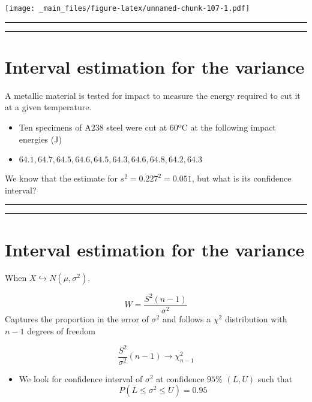 \documentclass[
]{book}
\providecommand{\tightlist}{%
  \setlength{\itemsep}{0pt}\setlength{\parskip}{0pt}}
\begin{document}
\texttt{[image: \_main\_files/figure-latex/unnamed-chunk-107-1.pdf]}

\begin{center}\rule{0.5\linewidth}{0.5pt}\end{center}

\begin{center}\rule{0.5\linewidth}{0.5pt}\end{center}

\hypertarget{interval-estimation-for-the-variance}{%
\section{Interval estimation for the variance}\label{interval-estimation-for-the-variance}}

A metallic material is tested for impact to measure the energy required to cut it at a given temperature.

\begin{itemize}
\item
  Ten specimens of A238 steel were cut at 60ºC at the following impact energies (J)
\item
  \(64.1, 64.7, 64.5, 64.6, 64.5, 64.3, 64.6, 64.8, 64.2, 64.3\)
\end{itemize}

We know that the estimate for \(s^2=0.227^2=0.051\), but what is its confidence interval?

\begin{center}\rule{0.5\linewidth}{0.5pt}\end{center}

\begin{center}\rule{0.5\linewidth}{0.5pt}\end{center}

\hypertarget{interval-estimation-for-the-variance-1}{%
\section{Interval estimation for the variance}\label{interval-estimation-for-the-variance-1}}

When \(X \hookrightarrow N(\mu, \sigma^2)\).

\[W=\frac{S^2(n-1)}{\sigma^2}\]
Captures the proportion in the error of \(\sigma^2\) and
follows a \(\chi^2\) distribution with \(n-1\) degrees of freedom

\[\frac{S^2}{\sigma^2}(n-1)\rightarrow \chi^2_{n-1}\]

\begin{itemize}
\tightlist
\item
  We look for confidence interval of \(\sigma^2\) at confidence \(95\%\) \((L,U)\) such that \[P(L \leq \sigma^2 \leq U)=0.95\]
\end{itemize}
\end{document}
